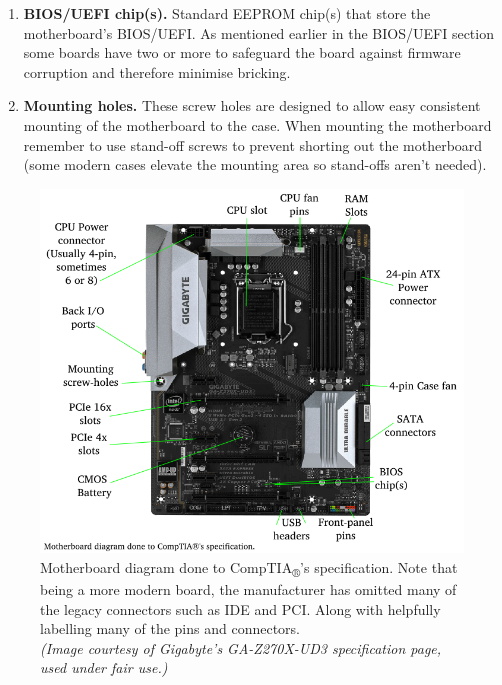 \documentclass{article}
\begin{document}
\begin{enumerate}
\item \textbf{BIOS/UEFI chip(s).} Standard EEPROM chip(s) that store the motherboard's BIOS/UEFI. As mentioned earlier in the BIOS/UEFI section some boards have two or more to safeguard the board against firmware corruption and therefore minimise bricking.

\item \textbf{Mounting holes.} These screw holes are designed to allow easy consistent mounting of the motherboard to the case. When mounting the motherboard remember to use stand-off screws to prevent shorting out the motherboard (some modern cases elevate the mounting area so stand-offs aren't needed).

\end{enumerate}



\begin{figure}
  \includegraphics[width=\linewidth]{images/png/20170202152238_big2.png}
  \caption{Motherboard diagram done to CompTIA\textsubscript{®}'s specification. Note that being a more modern board, the manufacturer has omitted many of the legacy connectors such as IDE and PCI. Along with helpfully labelling many of the pins and connectors. \\ \textit{(Image courtesy of Gigabyte's GA-Z270X-UD3 specification page, used under fair use.)}}
  \label{fig:MBDiagram}
\end{figure}
\end{document}
